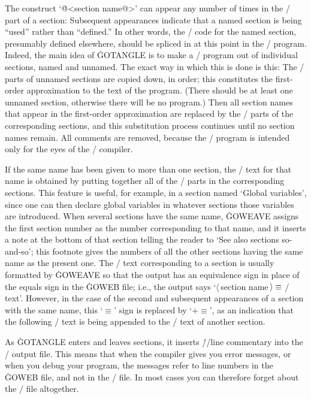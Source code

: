 The construct `\.{@<section name@>}' can appear
any number of times in the \GO/ part of a section:
Subsequent appearances indicate that a named section is being
``used'' rather than ``defined.'' In other words, the
\GO/ code for the named section, presumably defined elsewhere, should be
spliced in at this point in the \GO/ program.  Indeed,
the main idea of \.{GOTANGLE} is to make a \GO/ program out of
individual sections, named and unnamed.  The exact way in which this is done
is this: The \GO/ parts of unnamed sections are copied down,
in order; this constitutes the first-order
approximation to the text of the program. (There should be at least
one unnamed section, otherwise there will be no program.) Then all section
names that appear in the first-order approximation are replaced by the \GO/
parts of the corresponding sections, and this substitution process
continues until no section names remain. All comments are removed, because
the \GO/ program is intended only for the eyes of the \GO/ compiler.

If the same name has been given to more than one section, the \GO/ text
for that name is obtained by putting together all of the \GO/ parts in
the corresponding sections. This feature is useful, for example, in a
section named `Global variables', since one can then
declare global variables in whatever sections those variables are
introduced. When several sections have the same name, \.{GOWEAVE} assigns the
first section number as the number corresponding to that name, and it
inserts a note at the bottom of that section telling the reader to `See
also sections so-and-so'; this footnote gives the numbers of all the other
sections having the same name as the present one. The \GO/ text
corresponding to a section is usually formatted by \.{GOWEAVE} so that the
output has an equivalence sign in place of the equals sign in the \.{GOWEB}
file; i.e., the output says `$\langle\,$section
name$\,\rangle\equiv\null$\GO/ text'. However, in the case of the second
and subsequent appearances of a section with the same name, this `$\equiv$'
sign is replaced by `$\mathrel+\equiv$', as an indication that the
following \GO/ text is being appended to the \GO/ text of another section.

As \.{GOTANGLE} enters and leaves sections, it inserts 
\.{//line} commentary into the \GO/ output file.  This means that
when the compiler gives you error messages, or when you debug your program,
the messages refer to line numbers in the \.{GOWEB} file, and not in the
\GO/ file.  In most cases you can therefore
forget about the \GO/ file altogether.


